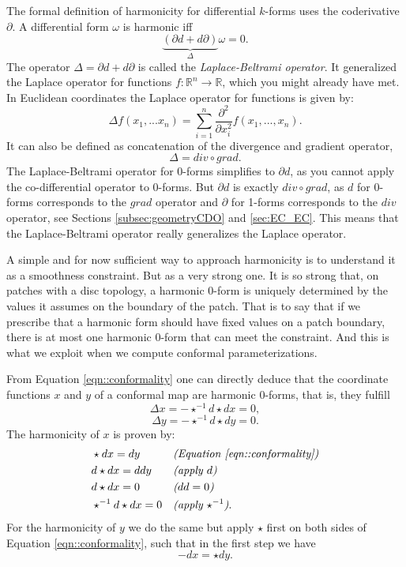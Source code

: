 The formal definition of harmonicity for differential $k$-forms uses the coderivative $\partial$. A differential form $\omega$ is harmonic iff 
\[\underbrace{(\partial d + d \partial)}_{\Delta} \omega = 0.\]
The operator $\Delta = \partial d + d \partial$ is called the \emph{Laplace-Beltrami operator}. It generalized the Laplace operator for functions $f:\mathbb R^n \to \mathbb R$, which you might already have met. In Euclidean coordinates the Laplace operator for functions is given by:
\[\Delta f(x_1,...x_n) = \sum_{i= 1}^n \frac{\partial^2 }{\partial x_i^2} f(x_1,...,x_n).\]
It can also be defined as concatenation of the divergence and gradient operator, 
\[\Delta = div \circ grad.\] 
The Laplace-Beltrami operator for 0-forms simplifies to $\partial d$, as you cannot apply the co-differential operator to 0-forms. But $\partial d$ is exactly $div \circ grad$, as $d$ for 0-forms corresponds to the $grad$ operator and $\partial$ for 1-forms corresponds to the $div$ operator, see Sections \ref{subsec:geometryCDO} and \ref{sec:EC_EC}. This means that the Laplace-Beltrami operator really generalizes the Laplace operator.

A simple and for now sufficient way to approach harmonicity is to understand it as a smoothness constraint. But as a very strong one. It is so strong that, on patches with a disc topology, a harmonic 0-form is uniquely determined by the values it assumes on the boundary of the patch. That is to say that if we prescribe that a harmonic form should have fixed values on a patch boundary, there is at most one harmonic 0-form that can meet the constraint. And this is what we exploit when we compute conformal parameterizations.
 
From Equation \ref{eqn::conformality} one can directly deduce that the coordinate functions $x$ and $y$ of a conformal map are harmonic 0-forms, that is, they fulfill 
\[\Delta x = - \star^{-1} d \star d x =0,\]
\[\Delta y = - \star^{-1} d \star d y = 0.\] 
The harmonicity of $x$ is proven by:
\begin{align*}
&\star d x = dy & & \textit{(Equation \ref{eqn::conformality})}\\
&d\star dx = ddy & & \textit{(apply $d$)} \\
&d\star dx = 0 & & \textit{($dd = 0$)} \\
&\star^{-1} d\star dx = 0 & & \textit{(apply $\star^{-1}$)}. 
\end{align*}
For the harmonicity of $y$ we do the same but apply $\star$ first on both sides of Equation \ref{eqn::conformality}, such that in the first step we have
\[-dx = \star dy.\]


